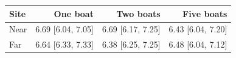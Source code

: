\begin{tabular}{lrrr}
\toprule
Site & One boat & Two boats & Five boats \\
\midrule
Near & 6.69 [6.04, 7.05] & 6.69 [6.17, 7.25] & 6.43 [6.04, 7.20] \\
Far & 6.64 [6.33, 7.33] & 6.38 [6.25, 7.25] & 6.48 [6.04, 7.12] \\
\bottomrule
\end{tabular}
